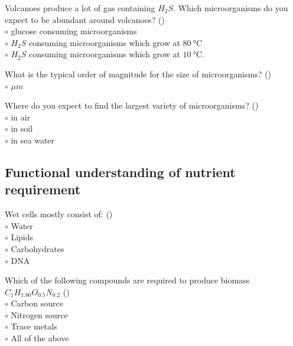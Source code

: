 \documentclass[]{beamer}
\begin{document}
\begin{frame}[shrink] {}
\addtocounter{questions}{1}
\color{blue}
Volcanoes produce a lot of gas containing $H_2S$. Which microorganisms do
you expect to be abundant around volcanoes? ()\\
\color{black}
\setlength{\parindent}{-0.4cm}
{\color{red}$\circ$} glucose consuming microorganisms\\
{\color{red}$\circ$} $H_2S$ consuming microorganisms which grow at $\SI{80}{\degreeCelsius}$\\
{\color{red}$\circ$} $H_2S$ consuming microorganisms which grow at $\SI{10}{\degreeCelsius}$. 
\end{frame}
\begin{frame}[shrink] {}
\addtocounter{questions}{1}
\color{blue}
What is the typical order of magnitude for the size of microorganisms? ()\\
\color{black}
\setlength{\parindent}{-0.4cm}
{\color{red}$\circ$} ${\mu}m$
\end{frame}
\begin{frame}[shrink] {}
\addtocounter{questions}{1}
\color{blue}
Where do you expect to find the largest variety of microorganisms? ()\\
\color{black}
\setlength{\parindent}{-0.4cm}
{\color{red}$\circ$} in air\\
{\color{red}$\circ$} in soil\\
{\color{red}$\circ$} in sea water\\
\end{frame}
\subsection{Functional understanding of nutrient requirement}
\setcounter{questions}{0}
\begin{frame}[shrink] {}
\addtocounter{questions}{1}
\color{blue}
Wet cells mostly consist of: ()\\
\color{black}
\setlength{\parindent}{-0.4cm}
{\color{red}$\circ$} Water\\ 
{\color{red}$\circ$} Lipids\\
{\color{red}$\circ$} Carbohydrates\\
{\color{red}$\circ$} DNA \\
\end{frame}
\begin{frame}[shrink] {}
\addtocounter{questions}{1}
\color{blue}
Which of the following compounds are required to produce biomass $C_1H_{1.80}O_{0.5}N_{0.2}$ ()\\
\color{black}
\setlength{\parindent}{-0.4cm}
{\color{red}$\circ$}  Carbon source\\
{\color{red}$\circ$} Nitrogen source\\
{\color{red}$\circ$} Trace metals\\
{\color{red}$\circ$} All of the above \\
\end{frame}
\end{document}
